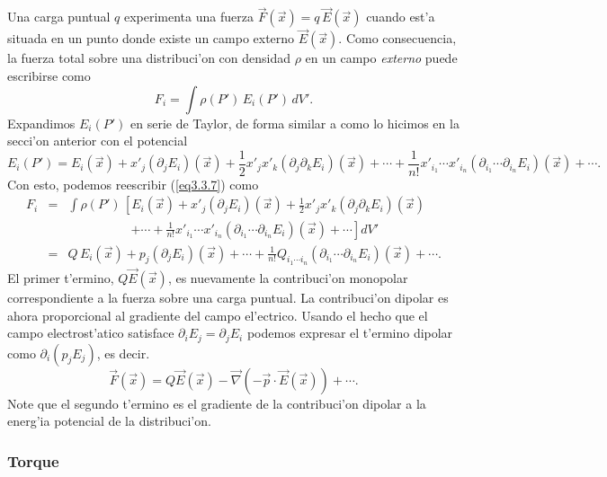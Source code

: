 Una carga puntual $q$ experimenta una fuerza
$\vec{F}(\vec{x})=q\,\vec{E}(\vec{x})$ cuando est'a situada en
un punto donde existe un campo externo $\vec{E}(\vec{x})$. Como consecuencia,
la fuerza total sobre una distribuci'on con densidad $\rho$ en un campo
\textit{externo} puede escribirse como
\begin{equation} \label{eq3.3.7}
F_i=\int \rho(P')\,E_i(P')\,dV'.
\end{equation}
Expandimos $E_i(P')$ en serie de Taylor, de forma similar a como lo
hicimos en la secci'on anterior con el potencial
\begin{equation} \label{eq3.3.7.1}
E_i(P')=E_i(\vec{x})+x'_j(\partial_jE_i)(\vec{x})+\frac{1}{
2}x'_jx'_k(\partial_j\partial_kE_i)(\vec{x})
+\cdots+\frac{1}{n!}x'_{i_1}\cdots
x'_{i_n}(\partial_{i_1}\cdots\partial_{i_n}E_i)(\vec {x})+\cdots .
\end{equation}
Con esto, podemos reescribir (\ref{eq3.3.7}) como
\begin{eqnarray}
F_i&=& \int
\rho(P')\,\left[E_i(\vec{x})+x'_j(\partial_jE_i)(\vec{x})+\frac{1}{
2}x'_jx'_k(\partial_j\partial_kE_i)(\vec{x}) \right.\nonumber\\
&& \quad\qquad\qquad \left. +\cdots+\frac{1}{n!}x'_{i_1}\cdots
x'_{i_n}(\partial_{i_1}\cdots\partial_{i_n}E_i)(\vec {x})+\cdots\right] dV' \\
&=&
Q\,E_i(\vec{x})+p_j(\partial_jE_i)(\vec{x})+\cdots+\frac{1}{n!}Q_{i_1\cdots i_n}
(\partial_{i_1}\cdots\partial_{i_n}E_i)(\vec {x})+\cdots .\label{eq3.3.8}
\end{eqnarray}
El primer t'ermino, $Q\vec{E}(\vec{x})$, es nuevamente la contribuci'on monopolar correspondiente a la fuerza sobre una carga puntual. La contribuci'on
dipolar es ahora proporcional al gradiente del campo el'ectrico. Usando el hecho que el campo electrost'atico satisface
$\partial_iE_j=\partial_jE_i$ podemos expresar el t'ermino dipolar como $\partial_i(p_jE_j)$,
es decir.
\begin{equation} \label{eq3.3.12}
\boxed{\vec{F}(\vec{x}) =
Q\vec{E}(\vec{x})-\vec{\nabla}\left(-\vec{p}\cdot\vec{E}(\vec{x})\right)+\cdots.
}
\end{equation}
Note que el segundo t'ermino es el gradiente de la contribuci'on dipolar a la
energ'ia potencial de la distribuci'on.

\subsubsection{Torque}  \label{ed3_3_3}

